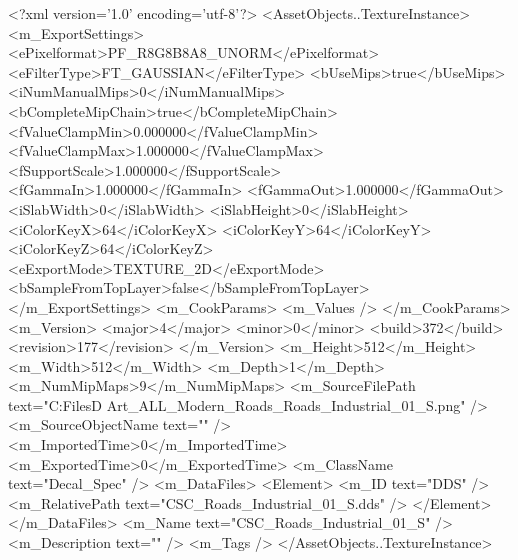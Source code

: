 <?xml version='1.0' encoding='utf-8'?>
<AssetObjects..TextureInstance>
  <m_ExportSettings>
    <ePixelformat>PF_R8G8B8A8_UNORM</ePixelformat>
    <eFilterType>FT_GAUSSIAN</eFilterType>
    <bUseMips>true</bUseMips>
    <iNumManualMips>0</iNumManualMips>
    <bCompleteMipChain>true</bCompleteMipChain>
    <fValueClampMin>0.000000</fValueClampMin>
    <fValueClampMax>1.000000</fValueClampMax>
    <fSupportScale>1.000000</fSupportScale>
    <fGammaIn>1.000000</fGammaIn>
    <fGammaOut>1.000000</fGammaOut>
    <iSlabWidth>0</iSlabWidth>
    <iSlabHeight>0</iSlabHeight>
    <iColorKeyX>64</iColorKeyX>
    <iColorKeyY>64</iColorKeyY>
    <iColorKeyZ>64</iColorKeyZ>
    <eExportMode>TEXTURE_2D</eExportMode>
    <bSampleFromTopLayer>false</bSampleFromTopLayer>
  </m_ExportSettings>
  <m_CookParams>
    <m_Values />
  </m_CookParams>
  <m_Version>
    <major>4</major>
    <minor>0</minor>
    <build>372</build>
    <revision>177</revision>
  </m_Version>
  <m_Height>512</m_Height>
  <m_Width>512</m_Width>
  <m_Depth>1</m_Depth>
  <m_NumMipMaps>9</m_NumMipMaps>
  <m_SourceFilePath text="C:\Users\Shadow\Desktop\Working Files\3D Art\Decals\CSC_ALL_Modern_Roads\textures\CSC_Roads_Industrial_01_S.png" />
  <m_SourceObjectName text="" />
  <m_ImportedTime>0</m_ImportedTime>
  <m_ExportedTime>0</m_ExportedTime>
  <m_ClassName text="Decal_Spec" />
  <m_DataFiles>
    <Element>
      <m_ID text="DDS" />
      <m_RelativePath text="CSC_Roads_Industrial_01_S.dds" />
    </Element>
  </m_DataFiles>
  <m_Name text="CSC_Roads_Industrial_01_S" />
  <m_Description text="" />
  <m_Tags />
</AssetObjects..TextureInstance>